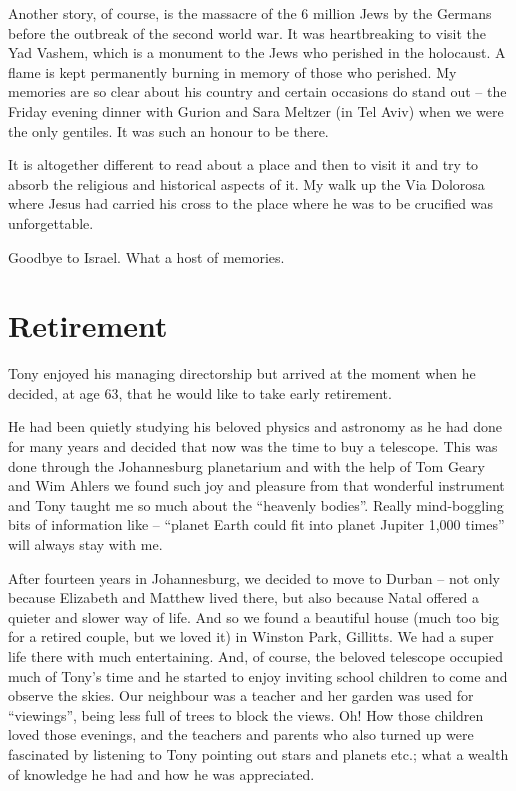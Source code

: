 Another story, of course, is the massacre of the 6 million Jews by the
Germans before the outbreak of the second world war. It was
heartbreaking to visit the Yad Vashem, which is a monument to the Jews
who perished in the holocaust. A flame is kept permanently burning in
memory of those who perished. My memories are so clear about his
country and certain occasions do stand out -- the Friday evening
dinner with Gurion and Sara Meltzer (in Tel Aviv) when we were the
only gentiles. It was such an honour to be there.

It is altogether different to read about a place and then to visit it
and try to absorb the religious and historical aspects of it. My walk
up the Via Dolorosa where Jesus had carried his cross to the place
where he was to be crucified was unforgettable.

Goodbye to Israel. What a host of memories.


\chapter{Retirement}

Tony enjoyed his managing directorship but arrived at the moment when
he decided, at age 63, that he would like to take early retirement.

He had been quietly studying his beloved physics and astronomy as he
had done for many years and decided that now was the time to buy a
telescope. This was done through the Johannesburg planetarium and with
the help of Tom Geary and Wim Ahlers we found such joy and pleasure
from that wonderful instrument and Tony taught me so much about the
``heavenly bodies''. Really mind-boggling bits of information like --
``planet Earth could fit into planet Jupiter 1,000 times'' will always
stay with me.

After fourteen years in Johannesburg, we decided to move to Durban --
not only because Elizabeth and Matthew lived there, but also because
Natal offered a quieter and slower way of life. And so we found a
beautiful house (much too big for a retired couple, but we loved it)
in Winston Park, Gillitts. We had a super life there with much
entertaining. And, of course, the beloved telescope occupied much of
Tony's time and he started to enjoy inviting school children to come
and observe the skies. Our neighbour was a teacher and her garden was
used for ``viewings'', being less full of trees to block the
views. Oh! How those children loved those evenings, and the teachers
and parents who also turned up were fascinated by listening to Tony
pointing out stars and planets etc.; what a wealth of knowledge he had
and how he was appreciated.

